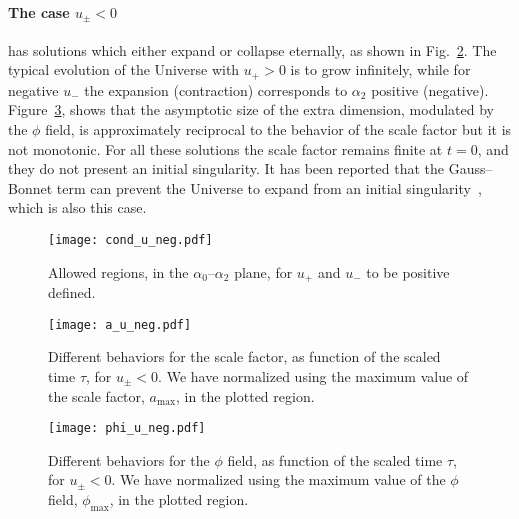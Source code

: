 \documentclass[aps,prd,12pt,superscriptaddress,showpacs,showkeys,longbibliography,reprint,nofootinbib]{revtex4-1}
\begin{document}
\paragraph{The case $u_\pm < 0$} has solutions which either expand or collapse eternally, as shown in Fig.~\ref{a_u_neg}. The typical evolution of the Universe with $u_+ > 0$ is to grow infinitely, while for negative $u_-$ the expansion (contraction) corresponds to $\alpha_2$ positive (negative). Figure~\ref{phi_u_neg}, shows that the asymptotic {size} of the extra dimension, modulated by the $\phi$ field, is approximately reciprocal to the behavior of the scale factor but it is not monotonic.
For all these solutions the scale factor remains finite at $t = 0$, and they do not present an initial singularity. It has been reported that the Gauss--Bonnet term can prevent the Universe to expand from an initial singularity~\cite{Deruelle:1986iv,Henriques:1986jw,*Ishihara:1986if}, which is also this case.

\begin{figure}[H]
  \texttt{[image: cond\_u\_neg.pdf]}
  \caption{Allowed regions, in the $\alpha_0$--$\alpha_2$ plane, for $u_+$ and $u_-$ to be positive defined.}
  \label{cond_u_neg}  
\end{figure}

\begin{figure}[H]
  \texttt{[image: a\_u\_neg.pdf]}
  \caption{Different behaviors for the scale factor, as function of the scaled time $\tau$, for $u_\pm < 0$. We have normalized using the maximum value of the scale factor, $a_{\mathrm{max}}$, in the plotted region.}
  \label{a_u_neg}
\end{figure}

\begin{figure}[H]
  \texttt{[image: phi\_u\_neg.pdf]}
  \caption{Different behaviors for the $\phi$ field, as function of the scaled time $\tau$, for $u_\pm < 0$. We have normalized using the maximum value of the $\phi$ field, $\phi_{\mathrm{max}}$, in the plotted region.}
  \label{phi_u_neg}
\end{figure}
\end{document}
